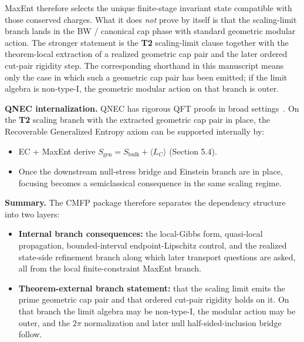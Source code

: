 MaxEnt therefore selects the unique finite-stage invariant state compatible with those conserved charges. What it does \emph{not} prove by itself is that the scaling-limit branch lands in the BW / canonical cap phase with standard geometric modular action. The stronger statement is the \textbf{T2} scaling-limit clause together with the theorem-local extraction of a realized geometric cap pair and the later ordered cut-pair rigidity step. The corresponding shorthand in this manuscript means only the case in which such a geometric cap pair has been emitted; if the limit algebra is non-type-I, the geometric modular action on that branch is outer.

\textbf{QNEC internalization.} QNEC has rigorous QFT proofs in broad settings~\cite{bousso16}. On the \textbf{T2} scaling branch with the extracted geometric cap pair in place, the Recoverable Generalized Entropy axiom can be supported internally by:
\begin{itemize}
\item
EC + MaxEnt derive \(S_{\mathrm{gen}}=S_{\mathrm{bulk}}+\langle L_C\rangle\) (Section 5.4).
\item
Once the downstream null-stress bridge and Einstein branch are in place, focusing becomes a semiclassical consequence in the same scaling regime.
\end{itemize}

\textbf{Summary.} The CMFP package therefore separates the dependency structure into two layers:
\begin{itemize}
\item
\textbf{Internal branch consequences:} the local-Gibbs form, quasi-local propagation, bounded-interval endpoint-Lipschitz control, and the realized state-side refinement branch along which later transport questions are asked, all from the local finite-constraint MaxEnt branch.
\item
\textbf{Theorem-external branch statement:} that the scaling limit emits the prime geometric cap pair and that ordered cut-pair rigidity holds on it. On that branch the limit algebra may be non-type-I, the modular action may be outer, and the \(2\pi\) normalization and later null half-sided-inclusion bridge follow.
\end{itemize}

